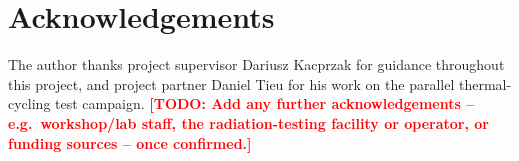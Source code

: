 \documentclass[12pt,a4paper]{article}
\newcommand{\todo}[1]{\textcolor{red}{\textbf{[TODO: #1]}}}
\begin{document}
\clearpage

\section*{Acknowledgements}

The author thanks project supervisor Dariusz Kacprzak for guidance throughout this project, and project partner Daniel Tieu for his work on the parallel thermal-cycling test campaign. \todo{Add any further acknowledgements -- e.g.\ workshop/lab staff, the radiation-testing facility or operator, or funding sources -- once confirmed.}



\clearpage
\end{document}
